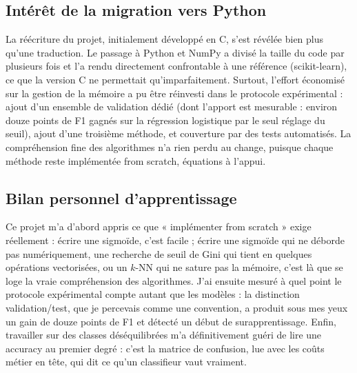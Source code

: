 \subsection{Intérêt de la migration vers Python}

La réécriture du projet, initialement développé en C, s'est révélée bien plus
qu'une traduction. Le passage à Python et NumPy a divisé la taille du code par
plusieurs fois et l'a rendu directement confrontable à une référence
(scikit-learn), ce que la version C ne permettait qu'imparfaitement. Surtout,
l'effort économisé sur la gestion de la mémoire a pu être réinvesti dans le
protocole expérimental : ajout d'un ensemble de validation dédié (dont
l'apport est mesurable : environ douze points de F1 gagnés sur la régression
logistique par le seul réglage du seuil), ajout d'une troisième méthode, et
couverture par des tests automatisés. La compréhension fine des algorithmes
n'a rien perdu au change, puisque chaque méthode reste implémentée from
scratch, équations à l'appui.

\subsection{Bilan personnel d'apprentissage}

Ce projet m'a d'abord appris ce que « implémenter from scratch » exige
réellement : écrire une sigmoïde, c'est facile ; écrire une sigmoïde qui ne
déborde pas numériquement, une recherche de seuil de Gini qui tient en quelques
opérations vectorisées, ou un $k$-NN qui ne sature pas la mémoire, c'est là que
se loge la vraie compréhension des algorithmes. J'ai ensuite mesuré à quel
point le protocole expérimental compte autant que les modèles : la distinction
validation/test, que je percevais comme une convention, a produit sous mes yeux
un gain de douze points de F1 et détecté un début de surapprentissage. Enfin,
travailler sur des classes déséquilibrées m'a définitivement guéri de lire une
accuracy au premier degré : c'est la matrice de confusion, lue avec les coûts
métier en tête, qui dit ce qu'un classifieur vaut vraiment.
